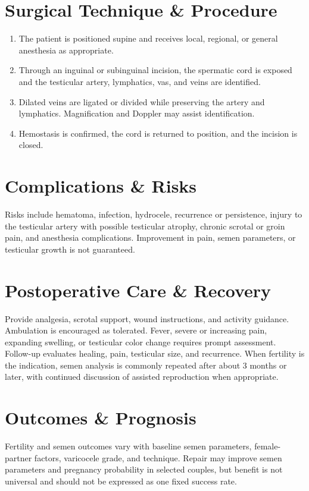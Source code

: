 \section*{Surgical Technique \& Procedure}
\begin{enumerate}
  \item The patient is positioned supine and receives local, regional, or general anesthesia as appropriate.
  \item Through an inguinal or subinguinal incision, the spermatic cord is exposed and the testicular artery, lymphatics, vas, and veins are identified.
  \item Dilated veins are ligated or divided while preserving the artery and lymphatics. Magnification and Doppler may assist identification.
  \item Hemostasis is confirmed, the cord is returned to position, and the incision is closed.
\end{enumerate}

\section*{Complications \& Risks}
Risks include hematoma, infection, hydrocele, recurrence or persistence, injury to the testicular artery with possible testicular atrophy, chronic scrotal or groin pain, and anesthesia complications. Improvement in pain, semen parameters, or testicular growth is not guaranteed.

\section*{Postoperative Care \& Recovery}
Provide analgesia, scrotal support, wound instructions, and activity guidance. Ambulation is encouraged as tolerated. Fever, severe or increasing pain, expanding swelling, or testicular color change requires prompt assessment. Follow-up evaluates healing, pain, testicular size, and recurrence. When fertility is the indication, semen analysis is commonly repeated after about 3 months or later, with continued discussion of assisted reproduction when appropriate.

\section*{Outcomes \& Prognosis}
Fertility and semen outcomes vary with baseline semen parameters, female-partner factors, varicocele grade, and technique. Repair may improve semen parameters and pregnancy probability in selected couples, but benefit is not universal and should not be expressed as one fixed success rate.

